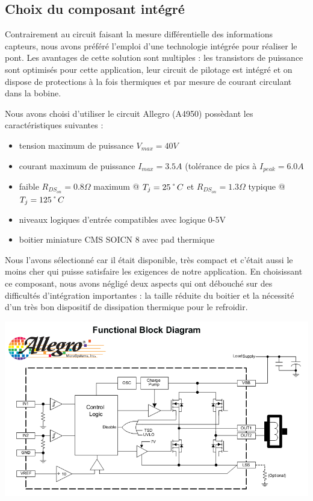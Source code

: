 \documentclass[11pt, french]{article} %
\begin{document}
\subsection{Choix du composant intégré}

Contrairement au circuit faisant la mesure différentielle des informations capteurs, nous avons préféré l'emploi d'une technologie intégrée pour réaliser le pont. Les avantages de cette solution sont multiples : les transistors de puissance sont optimisés pour cette application, leur circuit de pilotage est intégré et on dispose de protections à la fois thermiques et par mesure de courant circulant dans la bobine.

\medskip
\noindent
Nous avons choisi d'utiliser le circuit Allegro (A4950) possèdant les caractéristiques suivantes :
\medskip
\begin{itemize}
	\item tension maximum de puissance $ V_{max} = 40 V $
	\item courant maximum de puissance $ I_{max} = 3.5 A $ \newline
	(tolérance de pics à $ I_{peak} = 6.0 A$
	\item faible $R_{DS_{on}} = 0.8 \Omega $ maximum @ $ T_j = 25 \char23 C $ \newline
	et $R_{DS_{on}} = 1.3 \Omega $ typique @ $ T_j = 125 \char23 C $
	\item niveaux logiques d'entrée compatibles avec logique 0-5V
	\item boitier miniature CMS SOICN 8 avec pad thermique
\end {itemize}

\medskip
Nous l'avons sélectionné car il était disponible, très compact et c'était aussi le moins cher qui puisse satisfaire les exigences de notre application. En choisissant ce composant, nous avons négligé deux aspects qui ont débouché sur des difficultés d'intégration importantes : la taille réduite du boitier et la nécessité d'un très bon dispositif de dissipation thermique pour le refroidir.

\begin{center}
\includegraphics[width = 15cm]{SolutionAnalogique/A4950.png} 
\end{center}
\end{document}
